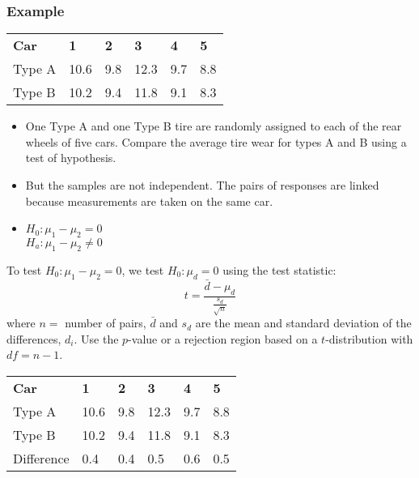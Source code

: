 \documentclass[12pt, letterpaper]{article}
\begin{document}
            \subsubsection*{Example}
                \begin{center}
                    \begin{tabular}{|l|l|l|l|l|l|}
                        \cline{1-6}
                        \textbf{Car} & \textbf{1} & \textbf{2} & \textbf{3} & \textbf{4} & \textbf{5} \\ \cline{1-6}
                        Type A & 10.6 & 9.8 & 12.3 & 9.7 & 8.8 \\ \cline{1-6}
                        Type B & 10.2 & 9.4 & 11.8 & 9.1 & 8.3 \\ \cline{1-6}
                    \end{tabular}
                \end{center}
                \begin{itemize}
                    \item One Type A and one Type B tire are randomly assigned to each of the rear wheels of five cars. Compare the average tire wear for types A and B using a test of hypothesis.
                    \item But the samples are not independent. The pairs of responses are linked because measurements are taken on the same car.
                    \item $H_0: \mu_1 - \mu_2 = 0$ \\ $H_a: \mu_1 - \mu_2 \neq 0$
                \end{itemize}
                \begin{mdframed}[leftmargin=0.5cm, rightmargin=0.5cm]
                    To test $H_0: \mu_1 - \mu_2 = 0$, we test $H_0: \mu_d = 0$ using the test statistic: $$t = \frac{\bar{d} - \mu_d}{\frac{s_d}{\sqrt{n}}}$$ 
                    where $n = $ number of pairs, $\bar{d}$ and $s_d$ are the mean and standard deviation of the differences, $d_i$. Use the $p$-value or a rejection region based  on a $t$-distribution with $df = n - 1$.
                \end{mdframed}
                \begin{center}
                    \begin{tabular}{|l|l|l|l|l|l|}
                        \cline{1-6}
                        \textbf{Car} & \textbf{1} & \textbf{2} & \textbf{3} & \textbf{4} & \textbf{5} \\ \cline{1-6}
                        Type A & 10.6 & 9.8 & 12.3 & 9.7 & 8.8 \\ \cline{1-6}
                        Type B & 10.2 & 9.4 & 11.8 & 9.1 & 8.3 \\ \cline{1-6}
                        Difference & 0.4 & 0.4 & 0.5 & 0.6 & 0.5 \\ \cline{1-6}
                    \end{tabular}
                \end{center}
\end{document}
